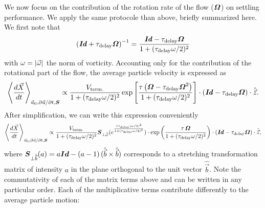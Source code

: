 We now focus on the contribution of the rotation rate of the flow ($\boldsymbol{\varOmega}$) on settling performance.
We apply the same protocole than above, briefly summarized here.
We first note that
\begin{equation}
	\left( \boldsymbol{\mathit{Id}} + \tau_{\mathrm{delay}} \boldsymbol{\varOmega} \right)^{-1} = \frac{\boldsymbol{\mathit{Id}} - \tau_{\mathrm{delay}} \boldsymbol{\varOmega}}{1 + (\tau_{\mathrm{delay}} \omega/2)^2}
\end{equation}
with $\omega = \lvert\vec{\omega}\rvert$ the norm of vorticity.
Accounting only for the contribution of the rotational part of the flow, the average particle velocity is expressed as
\begin{equation}
	\left\langle \frac{d \vec{X}}{dt} \right\rangle_{\vec{u}_0, \partial \vec{u} / \partial t, \boldsymbol{S}} \propto \frac{V_{\mathrm{term.}}}{1 + (\tau_{\mathrm{delay}} \omega/2)^2} \exp \left[ \frac{\tau \left( \boldsymbol{\varOmega} - \tau_{\mathrm{delay}} \boldsymbol{\varOmega}^2 \right)}{1 + (\tau_{\mathrm{delay}} \omega/2)^2} \right] \cdot \left( \boldsymbol{\mathit{Id}} - \tau_{\mathrm{delay}} \boldsymbol{\varOmega} \right) \cdot \hat{\vec{z}}.
\end{equation}
After simplification, we can write this expression conveniently
\begin{equation}
	\left\langle \frac{d \vec{X}}{dt} \right\rangle_{\vec{u}_0, \partial \vec{u} / \partial t, \boldsymbol{S}} \propto \frac{V_{\mathrm{term.}}}{1 + (\tau_{\mathrm{delay}} \omega/2)^2} \boldsymbol{S}_{\perp \hat{\vec{\omega}}} ( e^{\frac{\tau \tau_{\mathrm{delay}} (\omega/2)^2}{1 + (\tau_{\mathrm{delay}} \omega/2)^2}} ) \cdot \exp \left( \frac{\tau \, \boldsymbol{\varOmega}}{1 + (\tau_{\mathrm{delay}} \omega/2)^2} \right) \cdot \left( \boldsymbol{\mathit{Id}} - \tau_{\mathrm{delay}} \boldsymbol{\varOmega} \right) \cdot \hat{\vec{z}},
\end{equation}
where $\boldsymbol{S}_{\perp \hat{\vec{b}}}(a) = a \boldsymbol{Id} - (a - 1) \, (\hat{\vec{b}} \times \hat{\vec{b}})$ corresponds to a stretching transformation matrix of intensity $a$ in the plane orthogonal to the unit vector $\hat{\vec{b}}$.
Note the commutativity of each of the matrix terms above and can be written in any particular order.
Each of the multiplicative terms contribute differently to the average particle motion:
